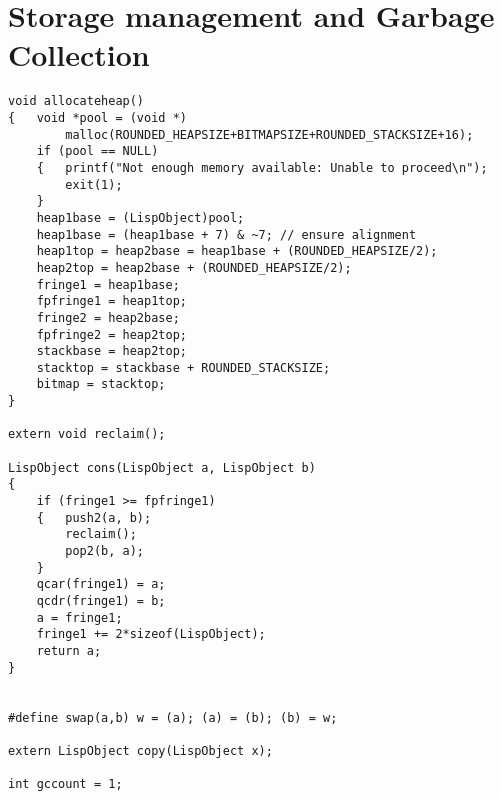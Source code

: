 \chapter{Storage management and Garbage Collection}




{\small\begin{verbatim}
void allocateheap()
{   void *pool = (void *)
        malloc(ROUNDED_HEAPSIZE+BITMAPSIZE+ROUNDED_STACKSIZE+16);
    if (pool == NULL)
    {   printf("Not enough memory available: Unable to proceed\n");
        exit(1);
    }
    heap1base = (LispObject)pool;
    heap1base = (heap1base + 7) & ~7; // ensure alignment
    heap1top = heap2base = heap1base + (ROUNDED_HEAPSIZE/2);
    heap2top = heap2base + (ROUNDED_HEAPSIZE/2);
    fringe1 = heap1base;
    fpfringe1 = heap1top;
    fringe2 = heap2base;
    fpfringe2 = heap2top;
    stackbase = heap2top;
    stacktop = stackbase + ROUNDED_STACKSIZE;
    bitmap = stacktop;
}

extern void reclaim();

LispObject cons(LispObject a, LispObject b)
{
    if (fringe1 >= fpfringe1)
    {   push2(a, b);
        reclaim();
        pop2(b, a);
    }
    qcar(fringe1) = a;
    qcdr(fringe1) = b;
    a = fringe1;
    fringe1 += 2*sizeof(LispObject);
    return a;
}


#define swap(a,b) w = (a); (a) = (b); (b) = w;

extern LispObject copy(LispObject x);

int gccount = 1;


\end{verbatim}}
